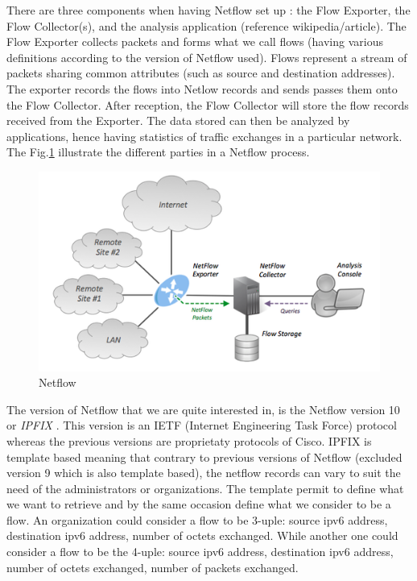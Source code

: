 There are three components when having Netflow set up : the Flow Exporter, the Flow Collector(s), and the analysis application (reference wikipedia/article). The Flow Exporter collects packets and forms what we call flows (having various definitions according to the version of Netflow used). Flows represent a stream of packets sharing common attributes (such as source and destination addresses). The exporter records the flows into Netlow records and sends passes them onto the Flow Collector. After reception, the Flow Collector will store the flow records received from the Exporter. The data stored can then be analyzed by applications, hence having statistics of traffic exchanges in a particular network. The Fig.\ref{fig:netflow} illustrate the different parties in a Netflow process.\\

\begin{figure}
  \centering
  \includegraphics[width=\textwidth]{res/netflow.png}
  \caption{Netflow}
  \label{fig:netflow}
\end{figure}

The version of Netflow that we are quite interested in, is the Netflow version 10 or \textit{IPFIX} \cite{claise2013rfc}. This version is an IETF (Internet Engineering Task Force) protocol whereas the previous versions are proprietaty protocols of Cisco. IPFIX is template based meaning that contrary to previous versions of Netflow (excluded version 9 which is also template based), the netflow records can vary to suit the need of the administrators or organizations. The template permit to define what we want to retrieve and by the same occasion define what we consider to be a flow. An organization could consider a flow to be 3-uple: source ipv6 address, destination ipv6 address, number of octets exchanged. While another one could consider a flow to be the 4-uple: source ipv6 address, destination ipv6 address, number of octets exchanged, number of packets exchanged. \\

